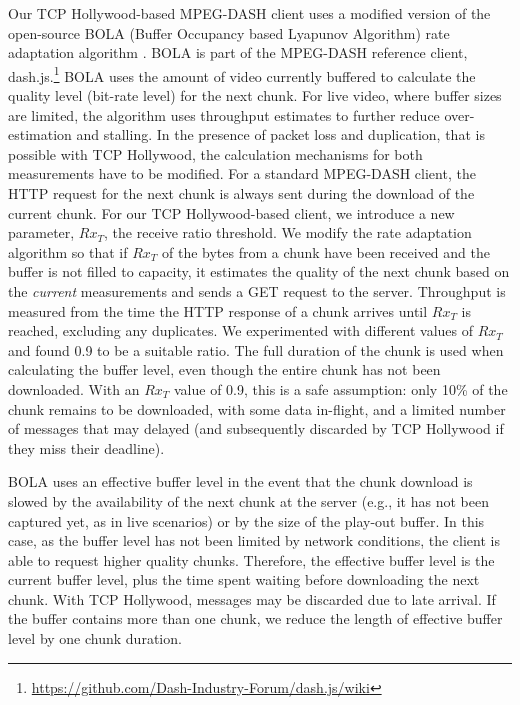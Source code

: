Our TCP Hollywood-based MPEG-DASH client uses a modified version of the open-source BOLA 
(Buffer Occupancy based Lyapunov Algorithm) rate adaptation algorithm \cite{spiteri2016bola}. 
BOLA is part of the MPEG-DASH reference
client, dash.js.\footnote{\url{https://github.com/Dash-Industry-Forum/dash.js/wiki}}
BOLA uses the amount of video currently buffered to calculate the quality level (bit-rate
level) for the next chunk. For live video, where buffer sizes are limited, the algorithm
uses throughput estimates to further reduce over-estimation and stalling. In the presence
of packet loss and duplication, that is possible with TCP Hollywood, the calculation 
mechanisms for both measurements have to be modified. For a standard MPEG-DASH client,
the HTTP request for the next chunk is always sent 
during the download of the current chunk. For our TCP Hollywood-based client, we
introduce a new parameter, $Rx_{T}$, the receive ratio threshold. We modify
the rate adaptation algorithm so that if $Rx_{T}$ of the
bytes from a chunk have been received and the buffer is not filled to capacity, 
it estimates the quality of the next chunk based on the \emph{current} measurements and
sends a GET request to the server. Throughput is measured from the time the HTTP response
of a chunk arrives until $Rx_{T}$ is reached, excluding any duplicates. We experimented
with different values of $Rx_{T}$ and found 0.9 to be a suitable ratio. The full duration
of the chunk is used when calculating the buffer level, even though the entire chunk has
not been downloaded. With an $Rx_{T}$ value of 0.9, this is a safe assumption: only 10\%
of the chunk remains to be downloaded, with some data in-flight, and a limited number of
messages that may delayed (and subsequently discarded by TCP Hollywood if
they miss their deadline).

BOLA uses an effective buffer level in the event that the chunk download is slowed by
the availability of the next chunk at the server (e.g., it has not been captured yet, as
in live scenarios) or by the size of the play-out buffer. In this case, as the buffer level has not
been limited by network conditions, the client is able to request higher quality chunks.
Therefore, the effective buffer level is the current buffer level, plus the time spent
waiting before downloading the next chunk. With TCP Hollywood, messages may be discarded
due to late arrival. If the buffer contains more than one chunk, we reduce the length of
effective buffer level by one chunk duration.

%
%

